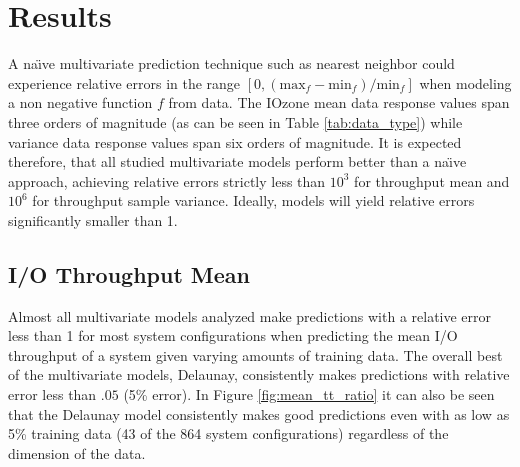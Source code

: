 \documentclass{scspaperproc}
\theoremstyle{scsthe}
\begin{document}
\section{Results}
\label{sec:results}

A na\"{\i}ve multivariate prediction technique such as nearest
neighbor could experience relative errors in the range $[0,
  (\text{max}_f - \text{min}_f) / \text{min}_f ]$ when modeling a non
negative function $f$ from data. The IOzone mean data response values
span three orders of magnitude (as can be seen in Table
\ref{tab:data_type}) while variance data response values span six
orders of magnitude. It is expected therefore, that all studied
multivariate models perform better than a na\"{\i}ve approach,
achieving relative errors strictly less than $10^3$ for throughput
mean and $10^6$ for throughput sample variance. Ideally, models will
yield relative errors significantly smaller than 1.

\subsection{I/O Throughput Mean}

Almost all multivariate models analyzed make predictions with a
relative error less than 1 for most system configurations when
predicting the mean I/O throughput of a system given varying amounts
of training data. The overall best of the multivariate models,
Delaunay, consistently makes predictions with relative error less than
$.05$ (5\% error). In Figure \ref{fig:mean_tt_ratio} it can also be
seen that the Delaunay model consistently makes good predictions even
with as low as 5\% training data (43 of the 864 system configurations)
regardless of the dimension of the data.
\end{document}
